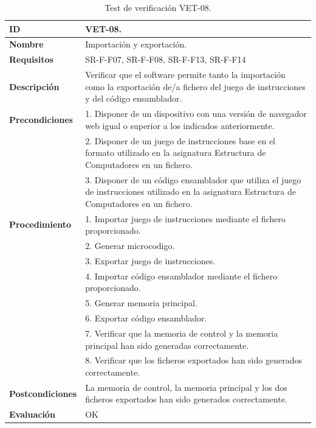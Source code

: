 \begin{center}
\begin{table}[htb]
\centering
\caption{Test de verificación VET-08.}
\begin{tabular}{@{}p{2.5cm} p{13cm}@{}} 
\toprule
\textbf{ID} 					& VET-08. \\
\midrule
\textbf{Nombre} 				& Importación y exportación. \\
\midrule
\textbf{Requisitos} 		& SR-F-F07, SR-F-F08, SR-F-F13, SR-F-F14\\
\midrule
\textbf{Descripción} 		& Verificar que el \gls{software} permite tanto la importación como la exportación de/a fichero del juego de instrucciones y del código \gls{ensamblador}. \\
\midrule
\textbf{Precondiciones}		& 1. Disponer de un dispositivo con una versión de navegador web igual o superior a los indicados anteriormente. \\
											& 2. Disponer de un juego de instrucciones base en el formato utilizado en la asignatura Estructura de Computadores en un fichero. \\
											& 3. Disponer de un código \gls{ensamblador} que utiliza el juego de instrucciones utilizado en la asignatura Estructura de Computadores en un fichero. \\
\midrule
\textbf{Procedimiento}		& 1. Importar juego de instrucciones mediante el fichero proporcionado.\\
											& 2. Generar \gls{microcodigo}.\\
											& 3. Exportar juego de instrucciones.\\
											& 4. Importar código \gls{ensamblador} mediante el fichero proporcionado.\\
											& 5. Generar memoria principal.\\
											& 6. Exportar código \gls{ensamblador}.\\
											& 7. Verificar que la memoria de control y la memoria principal han sido generadas correctamente.\\
											& 8. Verificar que los ficheros exportados han sido generados correctamente.\\
\midrule
\textbf{Postcondiciones} 		&  La memoria de control, la memoria principal y los dos ficheros exportados han sido generados correctamente.\\
\midrule
\textbf{Evaluación} 			& OK \\
\bottomrule
\end{tabular}
\label{tab:vet08}
\end{table}
\end{center}


